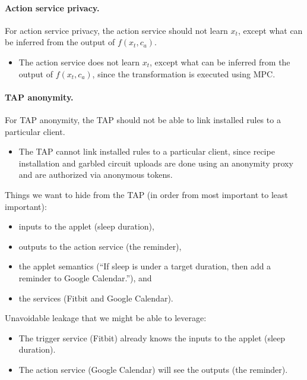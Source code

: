 \paragraph{Action service privacy.} For action service privacy, the action
service should not learn $x_t$, except what can be inferred from the output of
$f(x_t, c_a)$.
\begin{itemize}
  \item The action service does not learn $x_t$, except what can be inferred
    from the output of $f(x_t, c_a)$, since the transformation is executed using
    MPC.
\end{itemize}

\paragraph{TAP anonymity.} For TAP anonymity, the TAP should not be able to link
installed rules to a particular client.
\begin{itemize}
  \item The TAP cannot link installed rules to a particular client, since recipe
    installation and garbled circuit uploads are done using an anonymity proxy
    and are authorized via anonymous tokens.
\end{itemize}

\iffalse
Things we want to hide from the TAP (in order from most important to least
important):
\begin{itemize}[leftmargin=*]
  \item inputs to the applet (sleep duration),
  \item outputs to the action service (the reminder),
  \item the applet semantics (``If sleep is under a target duration, then add a
    reminder to Google Calendar.''), and
  \item the services (Fitbit and Google Calendar).
\end{itemize}\bigskip

Unavoidable leakage that we might be able to leverage:
\begin{itemize}[leftmargin=*]
  \item The trigger service (Fitbit) already knows the inputs to the applet
    (sleep duration).
  \item The action service (Google Calendar) will see the outputs (the
    reminder).
\end{itemize}\bigskip

